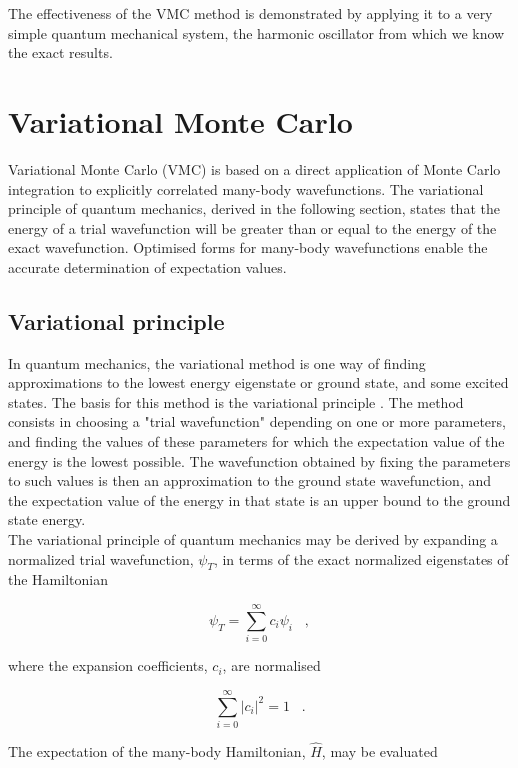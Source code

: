 \documentclass{article}
\begin{document}
The effectiveness of the VMC method is demonstrated by applying it to a very simple quantum mechanical system, the harmonic oscillator from which we know the exact results.

\section{Variational Monte Carlo}
Variational Monte Carlo (VMC) is based on a direct application of Monte Carlo integration to explicitly correlated many-body wavefunctions. The variational principle of quantum mechanics, derived in the following section, states that the energy of a trial wavefunction will be greater than or equal to the energy of the exact wavefunction. Optimised forms for many-body wavefunctions enable the accurate determination of expectation values.

\subsection{Variational principle}
In quantum mechanics, the variational method is one way of finding approximations to the lowest energy eigenstate or ground state, and some excited states. The basis for this method is the variational principle \citep{griffiths1995introduction, sakurai1994modern}. The method consists in choosing a "trial wavefunction" depending on one or more parameters, and finding the values of these parameters for which the expectation value of the energy is the lowest possible. The wavefunction obtained by fixing the parameters to such values is then an approximation to the ground state wavefunction, and the expectation value of the energy in that state is an upper bound to the ground state energy.\\

The variational principle of quantum mechanics may be derived by expanding a normalized trial wavefunction, $\psi_{T}$, in terms of the exact normalized eigenstates of the Hamiltonian

\begin{equation}
 \psi_T=\sum_{i=0}^{\infty} c_{i} \psi_i \;\;\;,
\end{equation}

where the expansion coefficients, $c_{i}$, are normalised 

\begin{equation}
\sum_{i=0}^{\infty} \vert c_{i}\vert^2=1 \;\;\;.
\end{equation}

The expectation of the many-body Hamiltonian, $\hat{H}$, may be evaluated 
\end{document}
